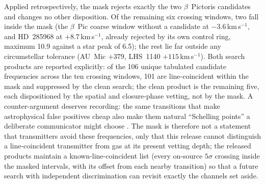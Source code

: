 \documentclass{openjournal}
\begin{document}
Applied retrospectively, the mask rejects exactly the two
$\beta$~Pictoris candidates and changes no other disposition. Of the
remaining six crossing windows, two fall inside the mask (the
$\beta$~Pic coarse window without a candidate at $-3.6$\,km\,s$^{-1}$, and
HD~285968 at $+8.7$\,km\,s$^{-1}$, already rejected by its own
control ring, maximum 10.9 against a star peak of 6.5); the rest lie
far outside any circumstellar tolerance (AU~Mic $+379$, LHS~1140
$+115$\,km\,s$^{-1}$). Both search products are reported explicitly:
of the 106 unique tabulated candidate frequencies across the ten
crossing windows, 101 are line-coincident within the mask and
suppressed by the clean search; the clean product is the remaining
five, each dispositioned by the spatial and closure-phase vetting,
not by the mask. A counter-argument deserves recording: the same
transitions that make astrophysical false positives cheap also make
them natural ``Schelling points'' a deliberate communicator might
choose \citep{CocconiMorrison1959}. The mask is therefore not a
statement that transmitters avoid these frequencies, only that this
release cannot distinguish a line-coincident transmitter from gas at
its present vetting depth; the released products maintain a
known-line-coincident list (every on-source $5\sigma$ crossing inside
the masked intervals, with its offset from each nearby transition) so
that a future search with independent discrimination can revisit
exactly the channels set aside.
\end{document}
